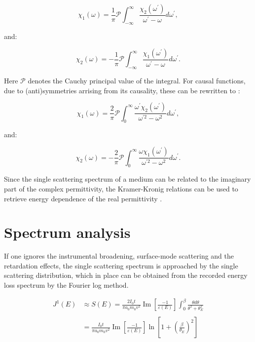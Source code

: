 \documentclass{article}
\begin{document}
\begin{equation}
    \chi_{1}(\omega)=\frac{1}{\pi} \mathcal{P} \int_{-\infty}^{\infty} \frac{\chi_{2}\left(\omega^{\prime}\right)}{\omega^{\prime}-\omega} d \omega^{\prime},
\end{equation}

and:

\begin{equation}
    \chi_{2}(\omega)=-\frac{1}{\pi} \mathcal{P} \int_{-\infty}^{\infty} \frac{\chi_{1}\left(\omega^{\prime}\right)}{\omega^{\prime}-\omega} d \omega^{\prime}.
\end{equation}

Here $\mathcal{P}$ denotes the Cauchy principal value of the integral. For causal functions, due to (anti)symmetries arrising from its causality, these can be rewritten to \cite{wikipedia_2020}:

\begin{equation}\label{eq_ch1_1}
    \chi_{1}(\omega)=\frac{2}{\pi} \mathcal{P} \int_{0}^{\infty} \frac{\omega^{\prime} \chi_{2}\left(\omega^{\prime}\right)}{\omega^{\prime 2}-\omega^{2}} d \omega^{\prime},
\end{equation}

and:

\begin{equation}
    \chi_{2}(\omega)=-\frac{2}{\pi} \mathcal{P} \int_{0}^{\infty} \frac{\omega \chi_{1}\left(\omega^{\prime}\right)}{\omega^{\prime 2}-\omega^{2}} d \omega^{\prime}.
\end{equation}


Since the single scattering spectrum of a medium can be related to the imaginary part of the complex permittivity, the Kramer-Kronig relations can be used to retrieve energy dependence of the real permittivity \cite{egerton_2011}. 




\section{Spectrum analysis}
If one ignores the instrumental broadening, surface-mode scattering and the retardation effects, the single scattering spectrum is approached by the single scattering distribution, which in place can be obtained from the recorded energy loss spectrum by the Fourier log method. \cite{egerton_2011}

\begin{equation}\label{eq_S_E}
\begin{aligned}
J^{1}(E) & \approx S(E)=\frac{2 I_{0} t}{\pi a_{0} m_{0} v^{2}} \operatorname{Im}\left[\frac{-1}{\varepsilon(E)}\right] \int_{0}^{\beta} \frac{\theta d \theta}{\theta^{2}+\theta_{E}^{2}} \\
\\
&=\frac{I_{0} t}{\pi a_{0} m_{0} v^{2}} \operatorname{Im}\left[\frac{-1}{\varepsilon(E)}\right] \ln \left[1+\left(\frac{\beta}{\theta_{E}}\right)^{2}\right]
\end{aligned}
\end{equation}
\end{document}
